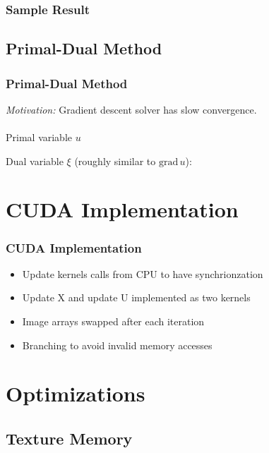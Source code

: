 \documentclass{beamer}
\begin{document}
\begin{frame}
  \frametitle{Sample Result}

\end{frame}

\subsection{Primal-Dual Method}

\begin{frame}
  \frametitle{Primal-Dual Method}
  \emph{Motivation:} Gradient descent solver has slow convergence.
  \\~\\
  Primal variable $ u $

  Dual variable $ \xi $ (roughly similar to $ \mathrm{grad} \, u $):
\end{frame}

\section{CUDA Implementation}

\begin{frame}
  \frametitle{CUDA Implementation}
  \begin{itemize}
  \item Update kernels calls from CPU to have synchrionzation

  \item Update X and update U implemented as two kernels

  \item Image arrays swapped after each iteration

  \item Branching to avoid invalid memory accesses
  
  \end{itemize}

\end{frame}

\section{Optimizations}


\subsection{Texture Memory}
\end{document}
